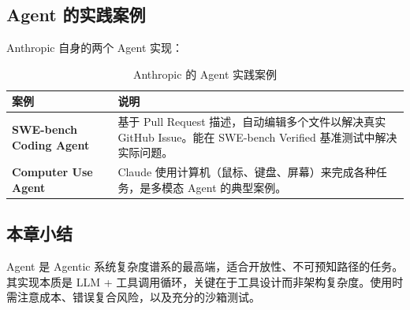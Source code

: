 \subsection{Agent 的实践案例}

Anthropic 自身的两个 Agent 实现：

\begin{table}[H]
\centering
\begin{tabular}{>{\bfseries}p{3.5cm} p{9cm}}
\toprule
案例 & 说明 \\
\midrule
SWE-bench Coding Agent & 基于 Pull Request 描述，自动编辑多个文件以解决真实 GitHub Issue。能在 SWE-bench Verified 基准测试中解决实际问题。 \\
Computer Use Agent & Claude 使用计算机（鼠标、键盘、屏幕）来完成各种任务，是多模态 Agent 的典型案例。 \\
\bottomrule
\end{tabular}
\caption{Anthropic 的 Agent 实践案例}
\end{table}

\subsection{本章小结}
Agent 是 Agentic 系统复杂度谱系的最高端，适合开放性、不可预知路径的任务。其实现本质是 LLM + 工具调用循环，关键在于工具设计而非架构复杂度。使用时需注意成本、错误复合风险，以及充分的沙箱测试。


